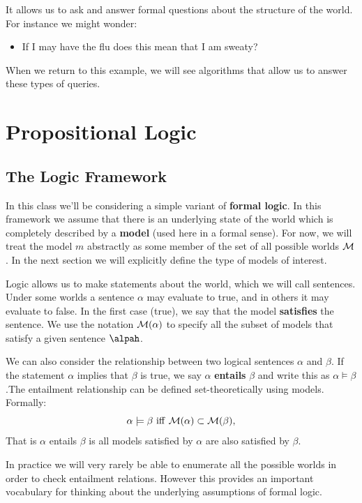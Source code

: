 \documentclass[11pt]{article}
\begin{document}
It allows us to ask and answer formal questions about the structure of the world. 
For instance we might wonder:

\begin{itemize}
\item If I may have the flu does this mean that I am sweaty?
\end{itemize}

\noindent When we return to this example, we will see algorithms that allow us to
answer these types of queries.

\section{Propositional Logic}

\subsection{The Logic Framework}

In this class we'll be considering a simple variant of
\textbf{formal logic}.  In this framework we assume that there is an
underlying state of the world which is completely described by a
\textbf{model} (used here in a formal sense). For now, we will treat the model $m$ abstractly as
some member of the set of all possible worlds $\mathcal{M}$. In the next
section we will explicitly define the type of models of interest.

Logic allows us to make statements about the world, which we will call
sentences.  Under some worlds a sentence $\alpha$ may evaluate to
true, and in others it may evaluate to false.  In the first case (true), we
say that the model \textbf{satisfies} the sentence. We use the
notation $\mathcal{M}(\alpha)$ to specify all the subset of models that satisfy a given
sentence $\alpah$.

We can also consider the relationship between two logical sentences
$\alpha$ and $\beta$.  If the statement $\alpha$ implies that $\beta$
is true, we say $\alpha$ \textbf{entails} $\beta$ and write this as
$\alpha \models \beta$.The entailment relationship can be defined set-theoretically using
models.  Formally: \[\alpha \models \beta \mathrm{\ iff\ } \mcM(\alpha)
\subset \mcM(\beta),\] \noindent That is $\alpha$ entails $\beta$ is all models satisfied by $\alpha$ are
also satisfied by $\beta$.
   
In practice we will very rarely be able to enumerate all the possible worlds in order to 
check entailment relations. However this provides an important vocabulary for thinking about the 
underlying assumptions of formal logic.
\end{document}
